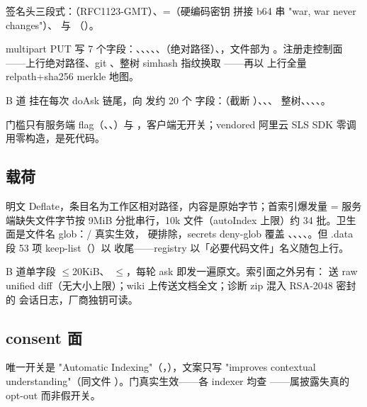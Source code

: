 签名头三段式：（RFC1123-GMT）、=（硬编码密钥  拼接 b64 串 "war, war never changes"）、 与 （）。

multipart PUT  写 7 个字段：、、、、、（绝对路径）、，文件部为 。注册走控制面 ——上行绝对路径、git 、整树 simhash 指纹换取 ——再以  上行全量 relpath+sha256 merkle 地图。

B 道  挂在每次 doAsk 链尾，向  发约 20 个  字段：（截断 ）、、、 整树、、、、。

门槛只有服务端 flag（、、）与 ，客户端无开关；vendored 阿里云 SLS SDK 零调用零构造，是死代码。

\subsection{载荷}

 明文 Deflate，条目名为工作区相对路径，内容是原始字节；首索引爆发量 = 服务端缺失文件字节按 9MiB 分批串行，10k 文件（autoIndex 上限）约 34 批。卫生面是文件名 glob：/ 真实生效， 硬排除，secrets deny-glob 覆盖 、、、、。但 .data 段 53 项 keep-list（）以  收尾——registry  以「必要代码文件」名义随包上行。

B 道单字段 $\le$20KiB、 $\le$，每轮 ask 即发一遍原文。索引面之外另有： 送 raw unified diff（无大小上限）；wiki 上传送文档全文；诊断 zip 混入 RSA-2048 密封的 \ep{[ACP]} 会话日志，厂商独钥可读。

\subsection{consent 面}

唯一开关是 "Automatic Indexing"（，），文案只写 "improves contextual understanding"（同文件 ）。门真实生效——各 indexer 均查 ——属披露失真的 opt-out 而非假开关。


